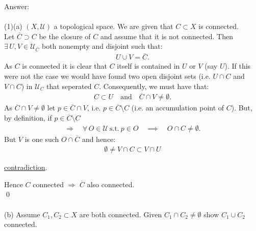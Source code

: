 \documentclass[12pt]{article}
\begin{document}
\vspace{1cm}
\noindent
Answer:\\
\\
(1)(a) $(X,\mathcal{U})$ a topological space. We are given that $C\subset X$ is connected.\\
Let $\overline{C} \supset C$ be the closure of $C$ and assume that it is not connected. Then $\exists\,U,V\in\mathcal{U}_{\overline{C}}$ both nonempty and disjoint such that:
\begin{align*}
U\cup V = \overline{C}.
\end{align*}
As $C$ is connected it is clear that $C$ itself is contained in $U$ or $V$ (say $U$).  If this were not the case
we would have found two open disjoint sets (i.e. $U \cap C$ and $V \cap C$) in $\mathcal{U}_{C}$ that seperated $C$.
Consequently, we must have that:
\begin{align*}
C\subset U \quad\text{and}\quad \overline{C}\cap V\neq\emptyset.
\end{align*}
As $\overline{C}\cap V\neq\emptyset$ let $p\in\overline{C}\cap V$, i.e. $p\in\overline{C}\setminus C$ (i.e. an accumulation point of $C$). But, by definition, if $p\in\overline{C}\setminus C$
\begin{align*}
\Rightarrow\quad \forall\,O\in\mathcal{U}\ \text{s.t.}\ p\in O
\quad\implies\quad O\cap C\neq\emptyset.
\end{align*}
But $V$ is one such $O \cap \overline{C}$ and hence:
\begin{align*}
\emptyset \neq V\cap C \subset V\cap U 
\end{align*}
\begin{center}
\underline{contradiction}.
\end{center}
Hence $C$ connected $\Rightarrow$ $\overline{C}$ also connected.\\
\qed\\
\\
(b) \noindent Assume $C_1,C_2\subset X$ are both connected.
Given $C_1\cap C_2\neq\emptyset$ show $C_1\cup C_2$ connected.
\end{document}
